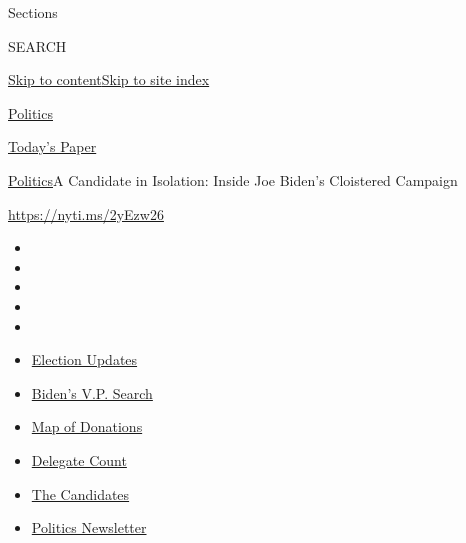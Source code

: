 Sections

SEARCH

\protect\hyperlink{site-content}{Skip to
content}\protect\hyperlink{site-index}{Skip to site index}

\href{https://www.nytimes.com/section/politics}{Politics}

\href{https://myaccount.nytimes.com/auth/login?response_type=cookie\&client_id=vi}{}

\href{https://www.nytimes.com/section/todayspaper}{Today's Paper}

\href{/section/politics}{Politics}\textbar{}A Candidate in Isolation:
Inside Joe Biden's Cloistered Campaign

\url{https://nyti.ms/2yEzw26}

\begin{itemize}
\item
\item
\item
\item
\item
\end{itemize}

\begin{itemize}
\item
  \href{https://www.nytimes.com/2020/07/31/us/elections/biden-vs-trump.html?action=click\&pgtype=Article\&state=default\&region=TOP_BANNER\&context=storylines_menu}{Election
  Updates}
\item
  \href{https://www.nytimes.com/article/biden-vice-president-2020.html?action=click\&pgtype=Article\&state=default\&region=TOP_BANNER\&context=storylines_menu}{Biden's
  V.P. Search}
\item
  \href{https://www.nytimes.com/interactive/2020/07/24/us/politics/trump-biden-campaign-donors.html?action=click\&pgtype=Article\&state=default\&region=TOP_BANNER\&context=storylines_menu}{Map
  of Donations}
\item
  \href{https://www.nytimes.com/interactive/2020/us/elections/delegate-count-primary-results.html?action=click\&pgtype=Article\&state=default\&region=TOP_BANNER\&context=storylines_menu}{Delegate
  Count}
\item
  \href{https://www.nytimes.com/interactive/2019/us/politics/2020-presidential-candidates.html?action=click\&pgtype=Article\&state=default\&region=TOP_BANNER\&context=storylines_menu}{The
  Candidates}
\item
  \href{https://www.nytimes.com/newsletters/politics?action=click\&pgtype=Article\&state=default\&region=TOP_BANNER\&context=storylines_menu}{Politics
  Newsletter}
\end{itemize}

